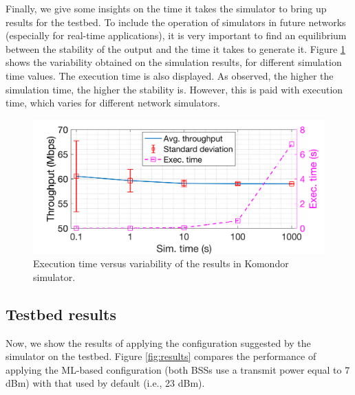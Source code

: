 \documentclass{article}
\begin{document}
	Finally, we give some insights on the time it takes the simulator to bring up results for the testbed. To include the operation of simulators in future networks (especially for real-time applications), it is very important to find an equilibrium between the stability of the output and the time it takes to generate it. Figure \ref{fig:test_sim_time_vs_accuracy} shows the variability obtained on the simulation results, for different simulation time values. The execution time is also displayed. As observed, the higher the simulation time, the higher the stability is. However, this is paid with execution time, which varies for different network simulators. 
	
	\begin{figure}[ht!]
		\centering
		\includegraphics[width=0.6\columnwidth]{test_sim_time_vs_accuracy.png}
		\caption{Execution time versus variability of the results in Komondor simulator.}
		\label{fig:test_sim_time_vs_accuracy}
	\end{figure}

	\subsection{Testbed results}
	Now, we show the results of applying the configuration suggested by the simulator on the testbed. Figure \ref{fig:results} compares the performance of applying the ML-based configuration (both BSSs use a transmit power equal to 7 dBm) with that used by default (i.e., 23 dBm).
	
\end{document}
